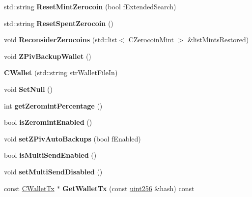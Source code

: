 \begin{DoxyCompactItemize}
std\+::string {\bfseries Reset\+Mint\+Zerocoin} (bool f\+Extended\+Search)
\item 
\mbox{\label{class_c_wallet_abc70af84f54700a62cf8ef530f6faaaa}} 
std\+::string {\bfseries Reset\+Spent\+Zerocoin} ()
\item 
\mbox{\label{class_c_wallet_ae0d869b52e1efd245bd5fcbbff925531}} 
void {\bfseries Reconsider\+Zerocoins} (std\+::list$<$ \mbox{\hyperlink{class_c_zerocoin_mint}{C\+Zerocoin\+Mint}} $>$ \&list\+Mints\+Restored)
\item 
\mbox{\label{class_c_wallet_ac927e0a05a08932a39dad485c482d052}} 
void {\bfseries Z\+Piv\+Backup\+Wallet} ()
\item 
\mbox{\label{class_c_wallet_a43878f79c7bc54f7af0884aa1da07b59}} 
{\bfseries C\+Wallet} (std\+::string str\+Wallet\+File\+In)
\item 
\mbox{\label{class_c_wallet_aba7996da1912459832dcbffdaed933a3}} 
void {\bfseries Set\+Null} ()
\item 
\mbox{\label{class_c_wallet_a2e9747db8ae491c751aac528b6e66752}} 
int {\bfseries get\+Zeromint\+Percentage} ()
\item 
\mbox{\label{class_c_wallet_a7c87d2cb8aa49a99a8a2ee4bd6bfc438}} 
bool {\bfseries is\+Zeromint\+Enabled} ()
\item 
\mbox{\label{class_c_wallet_a0ced8bbb68901a4d683c66a3664b1c2f}} 
void {\bfseries set\+Z\+Piv\+Auto\+Backups} (bool f\+Enabled)
\item 
\mbox{\label{class_c_wallet_aea9ec908c62d5d1bdb71e2eb7309c0eb}} 
bool {\bfseries is\+Multi\+Send\+Enabled} ()
\item 
\mbox{\label{class_c_wallet_ad6858daeeda6f2615e5cf9a1c2f3c20e}} 
void {\bfseries set\+Multi\+Send\+Disabled} ()
\item 
const \mbox{\hyperlink{class_c_wallet_tx}{C\+Wallet\+Tx}} $\ast$ {\bfseries Get\+Wallet\+Tx} (const \mbox{\hyperlink{classuint256}{uint256}} \&hash) const
\item 

\end{DoxyCompactItemize}
